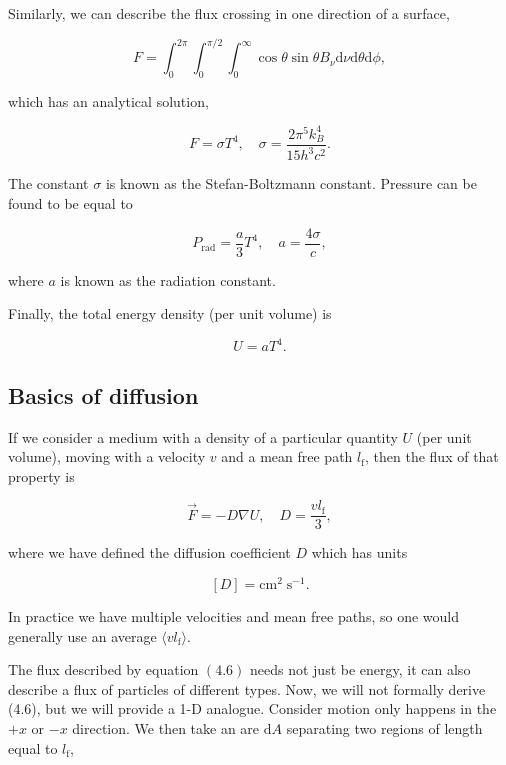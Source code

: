 \documentclass[twocolumn]{article}
\begin{document}
Similarly, we can describe the flux crossing in one direction of a
surface,

\[F=\int_0^{2\pi}\int_0^{\pi/2}\int_0^\infty \cos\theta\sin\theta B_\nu \mathrm{d}\nu \mathrm{d}\theta \mathrm{d}\phi,\]

which has an analytical solution,

\[F=\sigma T^4,\quad \sigma=\frac{2\pi^5 k_B^4}{15h^3c^2}.\]

The constant \(\sigma\) is known as the Stefan-Boltzmann constant.
Pressure can be found to be equal to

\[P_\mathrm{rad}=\frac{a}{3}T^4,\quad a=\frac{4\sigma}{c},\]

where \(a\) is known as the radiation constant.

Finally, the total energy density (per unit volume) is

\[U=aT^4. \tag{4.5}\]

\hypertarget{basics-of-diffusion}{%
\subsection{Basics of diffusion}\label{basics-of-diffusion}}

If we consider a medium with a density of a particular quantity \(U\)
(per unit volume), moving with a velocity \(v\) and a mean free path
\(l_\mathrm{f}\), then the flux of that property is

\[\vec{F}=-D\nabla U,\quad D=\frac{vl_\mathrm{f}}{3},\tag{4.6}\]

where we have defined the diffusion coefficient \(D\) which has units

\[[D]=\mathrm{cm^{2}\;s^{-1}}.\]

In practice we have multiple velocities and mean free paths, so one
would generally use an average \(\langle vl_\mathrm{f} \rangle\).

The flux described by equation \((4.6)\) needs not just be energy, it
can also describe a flux of particles of different types. Now, we will
not formally derive (4.6), but we will provide a 1-D analogue. Consider
motion only happens in the \(+x\) or \(-x\) direction. We then take an
are \(\mathrm{d}A\) separating two regions of length equal to
\(l_\mathrm{f}\),
\end{document}
